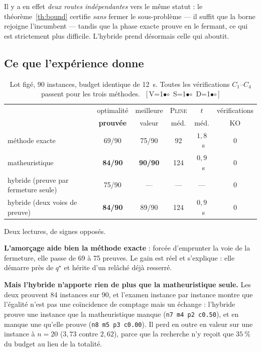 \documentclass[11pt,a4paper]{article}
\theoremstyle{plain}
\theoremstyle{remark}
\newcommand{\ILP}{\textsc{Pline}}
\newcommand{\qs}{q^{\star}}
\newcommand{\cfgm}[1]{\ifnum#1=1$\bullet$\else$\circ$\fi}
\newcommand{\conf}[3]{%
  \textsf{\footnotesize[\,V\cfgm{#1}\ S\cfgm{#2}\ D\cfgm{#3}\,]}}
\begin{document}
Il y a en effet \emph{deux routes indépendantes} vers le même statut :
le théorème~\ref{th:bound} certifie \emph{sans} fermer le sous-problème ---
il suffit que la borne rejoigne l'incumbent --- tandis que la phase exacte
prouve en le fermant, ce qui est strictement plus difficile. L'hybride prend
désormais celle qui aboutit.

\subsection{Ce que l'expérience donne}

\begin{table}[H]
\centering
\caption{Lot figé, 90 instances, budget identique de 12~s. Toutes les
vérifications $C_1$--$C_4$ passent pour les trois méthodes.\ \conf{0}{0}{0}}
\label{tab:hybride}
\setlength{\tabcolsep}{5pt}
\begin{tabular}{lccccc}
\toprule
& optimalité & meilleure & \ILP & $t$ & vérifications\\
& \textbf{prouvée} & valeur & méd. & méd. & KO\\
\midrule
méthode exacte & 69/90 & 75/90 & 92 & $1{,}8$~s & 0\\
matheuristique & \textbf{84/90} & \textbf{90/90} & 124 & $0{,}9$~s & 0\\
hybride (preuve par fermeture seule) & 75/90 & --- & --- & --- & 0\\
hybride (deux voies de preuve) & \textbf{84/90} & 89/90 & 124 & $0{,}9$~s & 0\\
\bottomrule
\end{tabular}
\end{table}

Deux lectures, de signes opposés.

\textbf{L'amorçage aide bien la méthode exacte} : forcée d'emprunter la voie
de la fermeture, elle passe de 69 à 75 preuves. Le gain est réel et
s'explique : elle démarre près de $\qs$ et hérite d'un relâché déjà resserré.

\textbf{Mais l'hybride n'apporte rien de plus que la matheuristique seule.}
Les deux prouvent 84 instances sur 90, et l'examen instance par instance
montre que l'égalité n'est pas une coïncidence de comptage mais un échange :
l'hybride prouve une instance que la matheuristique manque
(\texttt{n7 m4 p2 c0.50}), et en manque une qu'elle prouve
(\texttt{n8 m5 p3 c0.00}). Il perd en outre en valeur sur une instance à
$n=20$ ($3{,}73$ contre $2{,}62$), parce que la recherche n'y reçoit que
$35\ \%$ du budget au lieu de la totalité.
\end{document}
